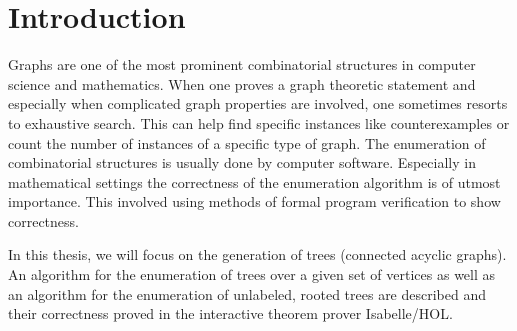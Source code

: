 
\chapter{Introduction}\label{chapter:introduction}

Graphs are one of the most prominent combinatorial structures in computer science and mathematics.
When one proves a graph theoretic statement and especially when complicated graph properties are involved, one sometimes resorts to exhaustive search.
This can help find specific instances like counterexamples or count the number of instances of a specific type of graph.
The enumeration of combinatorial structures is usually done by computer software.
Especially in mathematical settings the correctness of the enumeration algorithm is of utmost importance.
This involved using methods of formal program verification to show correctness.

In this thesis, we will focus on the generation of trees (connected acyclic graphs).
An algorithm for the enumeration of trees over a given set of vertices as well as an algorithm for the enumeration of unlabeled, rooted trees are described and their correctness proved in the interactive theorem prover Isabelle/HOL.

